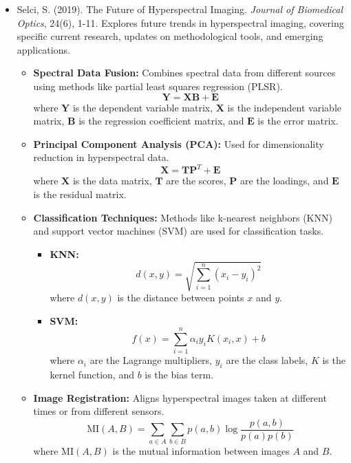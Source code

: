 \documentclass[10pt,svgnames,fragile]{beamer}
\begin{document}
\begin{frame}{}
\tiny
\begin{itemize}

    \item Selci, S. (2019). The Future of Hyperspectral Imaging. \textit{Journal of Biomedical Optics}, 24(6), 1-11. \href{https://www.spiedigitallibrary.org/journals/journal-of-biomedical-optics/volume-24/issue-6/061207/Medical-hyperspectral-imaging-a-review/10.1117/1.JBO.24.6.061207.full}{\color{blue}{DOI: 10.1117/1.JBO.24.6.061207}}
    {\color{gray}Explores future trends in hyperspectral imaging, covering specific current research, updates on methodological tools, and emerging applications.}
    \begin{itemize} \tiny
    \item \textbf{Spectral Data Fusion:} Combines spectral data from different sources using methods like partial least squares regression (PLSR).
    \[
    \mathbf{Y} = \mathbf{X}\mathbf{B} + \mathbf{E}
    \]
    where \(\mathbf{Y}\) is the dependent variable matrix, \(\mathbf{X}\) is the independent variable matrix, \(\mathbf{B}\) is the regression coefficient matrix, and \(\mathbf{E}\) is the error matrix.
    \item \textbf{Principal Component Analysis (PCA):} Used for dimensionality reduction in hyperspectral data.
    \[
    \mathbf{X} = \mathbf{TP}^T + \mathbf{E}
    \]
    where \(\mathbf{X}\) is the data matrix, \(\mathbf{T}\) are the scores, \(\mathbf{P}\) are the loadings, and \(\mathbf{E}\) is the residual matrix.
    \item \textbf{Classification Techniques:} Methods like k-nearest neighbors (KNN) and support vector machines (SVM) are used for classification tasks.
    \begin{itemize} \tiny
        \item \textbf{KNN:}
        \[
        d(x, y) = \sqrt{\sum_{i=1}^{n} (x_i - y_i)^2}
        \]
        where \(d(x, y)\) is the distance between points \(x\) and \(y\).
        \item \textbf{SVM:}
        \[
        f(x) = \sum_{i=1}^{n} \alpha_i y_i K(x_i, x) + b
        \]
        where \(\alpha_i\) are the Lagrange multipliers, \(y_i\) are the class labels, \(K\) is the kernel function, and \(b\) is the bias term.
    \end{itemize}
    \item \textbf{Image Registration:} Aligns hyperspectral images taken at different times or from different sensors.
    \[
    \text{MI}(A, B) = \sum_{a \in A} \sum_{b \in B} p(a, b) \log \frac{p(a, b)}{p(a)p(b)}
    \]
    where \(\text{MI}(A, B)\) is the mutual information between images \(A\) and \(B\).
\end{itemize}

\end{itemize}
\end{frame}
\end{document}
